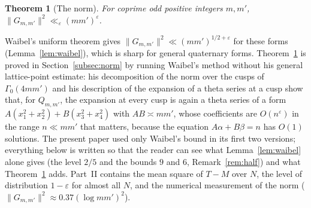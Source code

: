 \documentclass[11pt]{amsart}
\newtheorem{theorem}{Theorem}[section]
\theoremstyle{remark}
\newcommand{\e}{\varepsilon}
\begin{document}
\begin{theorem}[The norm]\label{thm:norm}
For coprime odd positive integers $m,m'$, $\|G_{m,m'}\|^2\ll_\e(mm')^{\e}$.
\end{theorem}

Waibel's uniform theorem \cite[Theorem~1]{Waibel} gives $\|G_{m,m'}\|^2\ll(mm')^{1/2+\e}$ for these forms (Lemma~\ref{lem:waibel}), which is sharp for general quaternary forms. Theorem~\ref{thm:norm} is proved in Section~\ref{subsec:norm} by running Waibel's method without his general lattice-point estimate: his decomposition of the norm over the cusps of $\Gamma_0(4mm')$ and his description of the expansion of a theta series at a cusp show that, for $Q_{m,m'}$, the expansion at every cusp is again a theta series of a form $A(x_1^2+x_2^2)+B(x_3^2+x_4^2)$ with $AB\asymp mm'$, whose coefficients are $O(n^\e)$ in the range $n\ll mm'$ that matters, because the equation $A\alpha+B\beta=n$ has $O(1)$ solutions. The present paper used only Waibel's bound in its first two versions; everything below is written so that the reader can see what Lemma~\ref{lem:waibel} alone gives (the level $2/5$ and the bounds $9$ and $6$, Remark~\ref{rem:half}) and what Theorem~\ref{thm:norm} adds. Part~II \cite{ChenII} contains the mean square of $T-M$ over $N$, the level of distribution $1-\e$ for almost all $N$, and the numerical measurement of the norm ($\|G_{m,m'}\|^2\approx0.37(\log mm')^2$).
\end{document}
